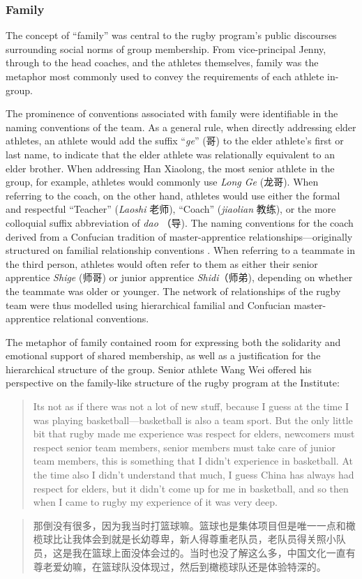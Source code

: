 \begin{CJK}{UTF8}{gbsn}
\subsubsection{Family}
The concept of ``family'' was central to the rugby program's public discourses surrounding social norms of group membership.  From vice-principal Jenny, through to the head coaches, and the athletes themselves, family was the metaphor most commonly used to convey the requirements of each athlete in-group.

The prominence of conventions associated with family were identifiable in the naming conventions of the team.  As a general rule, when directly addressing elder athletes, an athlete would add the suffix ``\textit{ge}'' (哥) to the elder athlete's first or last name, to indicate that the elder athlete was relationally equivalent to an elder brother.  When addressing Han Xiaolong, the most senior athlete in the group, for example, athletes would commonly use \textit{Long Ge} (龙哥).  When referring to the coach, on the other hand, athletes would use either the formal and respectful ``Teacher'' (\textit{Laoshi} 老师), ``Coach'' (\textit{jiaolian} 教练), or the more colloquial suffix abbreviation of \textit{dao} （导). The naming conventions for the coach derived from a Confucian tradition of master-apprentice relationships---originally structured on familial relationship conventions \citep{Spence1990}. When referring to a teammate in the third person, athletes would often refer to them as either their senior apprentice \textit{Shige} (师哥) or junior apprentice \textit{Shidi}（师弟), depending on whether the teammate was older or younger.  The network of relationships of the rugby team were thus modelled using hierarchical familial and Confucian master-apprentice relational conventions.

The metaphor of family contained room for expressing both the solidarity and emotional support of shared membership, as well as a justification for the hierarchical structure of the group.  Senior athlete Wang Wei offered his perspective on the family-like structure of the rugby program at the Institute:
    \begin{quote}
      Its not as if there was not a lot of new stuff, because I guess at the time I was playing basketball---basketball is also a team sport.  But the only little bit that rugby made me experience was respect for elders, newcomers must respect senior team members, senior members must take care of junior team members, this is something that I didn’t experience in basketball.  At the time also I didn’t understand that much, I guess China has always had respect for elders, but it didn’t come up for me in basketball, and so then when I came to rugby my experience of it was very deep.
    \end{quote}
    \begin{quote}
       那倒没有很多，因为我当时打篮球嘛。篮球也是集体项目但是唯一一点和橄榄球比让我体会到就是长幼尊卑，新人得尊重老队员，老队员得关照小队员，这是我在篮球上面没体会过的。当时也没了解这么多，中国文化一直有尊老爱幼嘛，在篮球队没体现过，然后到橄榄球队还是体验特深的。
    \end{quote}


\end{CJK}
